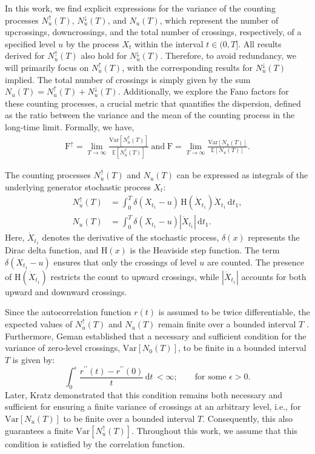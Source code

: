 \documentclass[journal]{IEEEtran}
\theoremstyle{plain}
\theoremstyle{definition}
\theoremstyle{remark}
\newcommand{\E}{\mathbb{E}}
\newcommand{\FF}{\mathrm{F}}
\newcommand{\FFup}{\mathrm{F}^\uparrow}
\newcommand{\Nu}{N_u(T)}
\newcommand{\Nup}{N_u^{\uparrow}(T)}
\newcommand{\Ndown}{N_u^{\downarrow}(T)}
\newcommand{\dd}{\mathrm{d}}
\newcommand{\Var}{\text{Var}}
\newcommand{\rpp}{r^{\prime\prime}}
\begin{document}
In this work, we find explicit expressions for the variance of the counting processes $\Nup$, $\Ndown$, and $\Nu$, which represent the number of upcrossings, downcrossings, and the total number of crossings, respectively, of a specified level $u$ by the process $X_t$ within the interval $t \in (0, T]$. All results derived for $\Nup$ also hold for $\Ndown$. Therefore, to avoid redundancy, we will primarily focus on $\Nup$, with the corresponding results for $\Ndown$ implied. The total number of crossings is simply given by the sum $\Nu = \Nup + \Ndown$. Additionally, we explore the Fano factors for these counting processes, a crucial metric that quantifies the dispersion, defined as the ratio between the variance and the mean of the counting process in the long-time limit. Formally, we have,
\begin{equation}
\begin{split}
    \FFup = \lim_{T \to \infty}\frac{\Var[\Nup]}{\E[\Nup]} \; \text{and} \;\FF = \lim_{T \to \infty}\frac{\Var[\Nu]}{\E[\Nu]}. 
\end{split}
\end{equation}

The counting processes $\Nup$ and $\Nu$ can be expressed as integrals of the underlying generator stochastic process $X_t$:
\begin{equation}
\begin{split}
    \Nup &= \int_0^T \delta\left(X_{t_1} - u\right) \, \mathrm{H}\left(\dot{X}_{t_1}\right) \dot{X}_{t_1} \, \dd t_1, \\
    \Nu &= \int_0^T \delta\left(X_{t_1} - u\right) \left|\dot{X}_{t_1}\right| \, \dd t_1.
\end{split} \label{eq:defn_Nu_delta_main}
\end{equation} 
Here, $\dot{X}_{t_1}$ denotes the derivative of the stochastic process, $\delta(x)$ represents the Dirac delta function, and $\mathrm{H}(x)$ is the Heaviside step function. The term $\delta\left(X_{t_1} - u\right)$ ensures that only the crossings of level $u$ are counted. The presence of $\mathrm{H}(\dot{X}_{t_1})$ restricts the count to upward crossings, while $|\dot{X}_{t_1}|$ accounts for both upward and downward crossings.

Since the autocorrelation function $r(t)$ is assumed to be twice differentiable, the expected values of $\Nup$ and $\Nu$ remain finite over a bounded interval $T$ \cite{ito1963expected, ylvisaker1965expected}. Furthermore, Geman \cite{geman1972variance} established that a necessary and sufficient condition for the variance of zero-level crossings, $\Var\left[N_0(T)\right]$, to be finite in a bounded interval $T$ is given by:
\begin{equation}
    \int_0^\epsilon \frac{\rpp(t) - \rpp(0)}{t}\, \dd t \, < \infty; \qquad \text{for some } \epsilon > 0. \label{eq:geman_condition}
\end{equation}
Later, Kratz \cite{kratz2006} demonstrated that this condition remains both necessary and sufficient for ensuring a finite variance of crossings at an arbitrary level, i.e., for $\Var\left[\Nu\right]$ to be finite over a bounded interval $T$. Consequently, this also guarantees a finite $\Var[\Nup]$. Throughout this work, we assume that this condition is satisfied by the correlation function.
\end{document}
